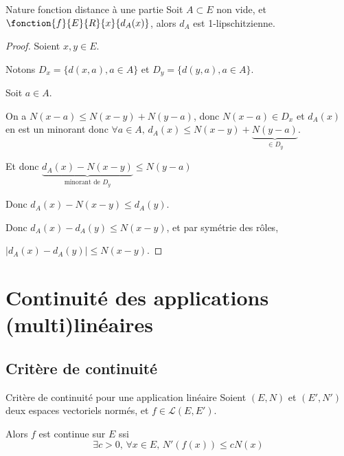 \begin{proposition}{Nature fonction distance à une partie}{}
    Soit $A \subset E$ non vide, et $\fonction{f}{E}{R}{x}{d_A(x)}$,
    alors $d_A$ est 1-lipschitzienne. 
\end{proposition}

\begin{proof}
    Soient $x, y \in E$. 

    Notons $D_x = \{d(x, a), a \in A\}$ et $D_y = \{d(y, a), a \in A\}$.

    Soit $a \in A$. 

    On a $N(x - a) \leqslant N(x - y) + N(y - a)$, donc $N(x - a) \in D_x$ et 
    $d_A(x)$ en est un minorant donc $\forall a \in A, \, d_A(x) \leqslant N(x - y) + \underbrace{N(y - a)}_{\in D_y}$.

    Et donc $\underbrace{d_A(x) - N(x - y)}_{\text{minorant de } D_y} \leqslant N(y - a)$

    Donc $d_A(x) - N(x - y) \leqslant d_A(y)$.

    Donc $d_A(x) - d_A(y) \leqslant N(x - y)$, et par symétrie des rôles, 

    $|d_A(x) - d_A(y)| \leqslant N(x - y)$.
\end{proof}

\section{Continuité des applications (multi)linéaires}
\subsection{Critère de continuité}

\begin{theoreme}{Critère de continuité pour une application linéaire}{}
    Soient $(E, N)$ et $(E', N')$ deux espaces vectoriels normés, et $ f \in \mathscr L(E, E')$.

    Alors $f$ est continue sur $E$ ssi 
    \[\exists c > 0, \, \forall x \in E, \, N'(f(x)) \leqslant c N(x)\]
\end{theoreme}


